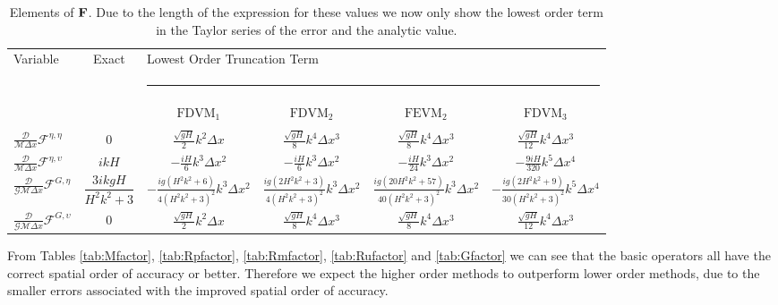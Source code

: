 \begin{table}
\centering
	\begin{adjustbox}{angle=90}
	  \begin{tabular}{l c c c c c}
	     	Variable& Exact &\multicolumn{4}{l}{Lowest Order Truncation Term}\\
	     	 & &  \multicolumn{4}{l}{\rule{1\textwidth}{0.4pt}} \\
	     	 & & $\text{FDVM}_1$& $\text{FDVM}_2$& $\text{FEVM}_2$ & $\text{FDVM}_3$ \\
	     	 \hline \\
	     	$ \frac{\mathcal{D}}{\mathcal{M}\Delta x}\mathcal{F}^{\eta,\eta}$& $0$ & $\frac{\sqrt{gH}}{2}k^2 \Delta x$&$\frac{\sqrt{gH}}{8}k^4 \Delta x^3$& $\frac{\sqrt{gH}}{8}k^4 \Delta x^3$ & $\frac{\sqrt{gH}}{12}k^4 \Delta x^3$ \\ [5mm]
	     	$\frac{\mathcal{D}}{\mathcal{M}\Delta x} \mathcal{F}^{\eta,\upsilon}$& $ikH$  &$ -\frac{iH}{6} k^3 \Delta x^2$&$ -\frac{iH}{6} k^3 \Delta x^2$& $ -\frac{iH}{24} k^3 \Delta x^2$ & $ -\frac{9iH}{320} k^5 \Delta x^4$ \\ [5mm]
	  	    $ \frac{\mathcal{D}}{\mathcal{G}\mathcal{M}\Delta x} \mathcal{F}^{G,\eta}$& $\dfrac{3ikgH}{H^2k^2 +3}$ & $-\frac{ig\left(H^2k^2 + 6\right)}{4\left(H^2k^2 +3\right)^2} k^3 \Delta x^2$ & $\frac{ig\left(2H^2k^2 + 3\right)}{4\left(H^2k^2 +3\right)^2} k^3 \Delta x^2$& $\frac{ig\left(20H^2k^2 + 57 \right)}{40\left(H^2k^2 +3\right)^2} k^3 \Delta x^2$ & $-\frac{ig\left(2H^2k^2 + 9\right)}{30\left(H^2k^2 +3\right)^2}k^5 \Delta x^4$ \\  [5mm]
	  	    $\frac{\mathcal{D}}{\mathcal{G}\mathcal{M}\Delta x} \mathcal{F}^{G,\upsilon}$& $0$ & $\frac{\sqrt{gH}}{2}k^2 \Delta x$&$\frac{\sqrt{gH}}{8}k^4 \Delta x^3$& $\frac{\sqrt{gH}}{8}k^4 \Delta x^3$ & $\frac{\sqrt{gH}}{12}k^4 \Delta x^3$ \\ 
	  \end{tabular}
	\end{adjustbox}
	\caption{Elements of $\mathbf{F}$. Due to the length of the expression for these values we now only show the lowest order term in the Taylor series of the error and the analytic value.}
	\label{tab:Ffactor}
\end{table}

From Tables \ref{tab:Mfactor}, \ref{tab:Rpfactor}, \ref{tab:Rmfactor}, \ref{tab:Rufactor} and \ref{tab:Gfactor} we can see that the basic operators all have the correct spatial order of accuracy or better. Therefore we expect the higher order methods to outperform lower order methods, due to the smaller errors associated with the improved spatial order of accuracy.

